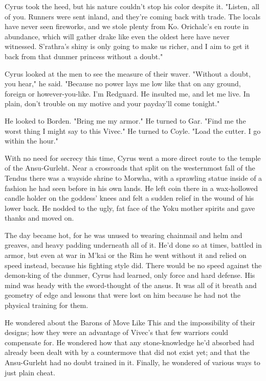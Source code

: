 Cyrus took the heed, but his nature couldn't stop his color despite it. "Listen, all of you. Runners were sent inland, and they're coming back with trade. The locals have never seen fireworks, and we stole plenty from Ko. Orichalc's en route in abundance, which will gather drake like even the oldest here have never witnessed. S'rathra's shiny is only going to make us richer, and I aim to get it back from that dunmer princess without a doubt."

Cyrus looked at the men to see the measure of their waver. "Without a doubt, you hear," he said. "Because no power lays me low like that on any ground, foreign or however-you-like. I’m Redguard. He insulted me, and let me live. In plain, don't trouble on my motive and your payday’ll come tonight."

He looked to Borden. "Bring me my armor." He turned to Gar. "Find me the worst thing I might say to this Vivec." He turned to Coyle. "Load the cutter. I go within the hour."

\parabreak

With no need for secrecy this time, Cyrus went a more direct route to the temple of the Ansu-Gurleht. Near a crossroads that split on the westernmost fall of the Tendus there was a wayside shrine to Morwha, with a sprawling statue inside of a fashion he had seen before in his own lands. He left coin there in a wax-hollowed candle holder on the goddess' knees and felt a sudden relief in the wound of his lower back. He nodded to the ugly, fat face of the Yoku mother spirits and gave thanks and moved on.

The day became hot, for he was unused to wearing chainmail and helm and greaves, and heavy padding underneath all of it. He'd done so at times, battled in armor, but even at war in M'kai or the Rim he went without it and relied on speed instead, because his fighting style did. There would be no speed against the demon-king of the dunmer, Cyrus had learned, only force and hard defense. His mind was heady with the sword-thought of the ansus. It was all of it breath and geometry of edge and lessons that were lost on him because he had not the physical training for them.

He wondered about the Barons of Move Like This and the impossibility of their designs; how they were an advantage of Vivec's that few warriors could compensate for. He wondered how that any stone-knowledge he'd absorbed had already been dealt with by a countermove that did not exist yet; and that the Ansu-Gurleht had no doubt trained in it. Finally, he wondered of various ways to just plain cheat.

